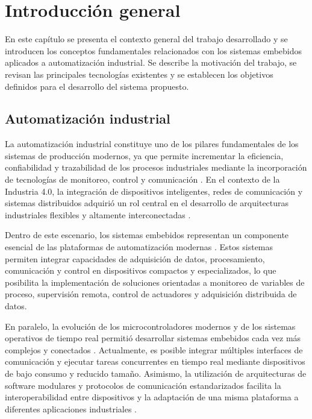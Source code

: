 \chapter{Introducción general}
\label{Chapter1}

En este capítulo se presenta el contexto general del trabajo desarrollado y se introducen los conceptos fundamentales relacionados con los sistemas embebidos aplicados a automatización industrial. Se describe la motivación del trabajo, se revisan las principales tecnologías existentes y se establecen los objetivos definidos para el desarrollo del sistema propuesto.


\section{Automatización industrial}

La automatización industrial constituye uno de los pilares fundamentales de los sistemas de producción modernos, ya que permite incrementar la eficiencia, confiabilidad y trazabilidad de los procesos industriales mediante la incorporación de tecnologías de monitoreo, control y comunicación \cite{future_industrial_communication}. En el contexto de la Industria 4.0, la integración de dispositivos inteligentes, redes de comunicación y sistemas distribuidos adquirió un rol central en el desarrollo de arquitecturas industriales flexibles y altamente interconectadas \cite{future_industrial_communication,communication_technology_i40}.

Dentro de este escenario, los sistemas embebidos representan un componente esencial de las plataformas de automatización modernas \cite{shylla2023embedded}. Estos sistemas permiten integrar capacidades de adquisición de datos, procesamiento, comunicación y control en dispositivos compactos y especializados, lo que posibilita la implementación de soluciones orientadas a monitoreo de variables de proceso, supervisión remota, control de actuadores y adquisición distribuida de datos.

En paralelo, la evolución de los microcontroladores modernos y de los sistemas operativos de tiempo real permitió desarrollar sistemas embebidos cada vez más complejos y conectados \cite{overview_embedded_i40}. Actualmente, es posible integrar múltiples interfaces de comunicación y ejecutar tareas concurrentes en tiempo real mediante dispositivos de bajo consumo y reducido tamaño. Asimismo, la utilización de arquitecturas de software modulares y protocolos de comunicación estandarizados facilita la interoperabilidad entre dispositivos y la adaptación de una misma plataforma a diferentes aplicaciones industriales \cite{overview_embedded_i40,communication_technology_i40}.

